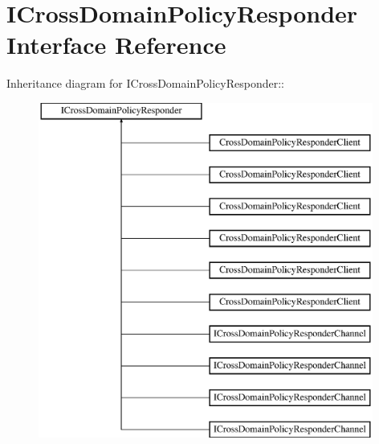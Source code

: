 \hypertarget{interface_i_cross_domain_policy_responder}{
\section{ICrossDomainPolicyResponder Interface Reference}
\label{interface_i_cross_domain_policy_responder}
}
Inheritance diagram for ICrossDomainPolicyResponder::\begin{figure}[H]
\begin{center}
\leavevmode
\includegraphics[height=11cm]{interface_i_cross_domain_policy_responder}
\end{center}
\end{figure}
